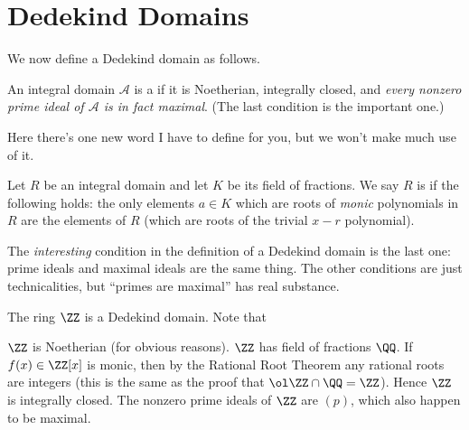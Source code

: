 \section{Dedekind Domains}
We now define a Dedekind domain as follows.
\begin{definition}
	An integral domain $\mathcal A$ is a 
	if it is Noetherian, integrally closed, and 
	\emph{every nonzero prime ideal of $\mathcal A$ is in fact maximal}.
	(The last condition is the important one.)
\end{definition}
Here there's one new word I have to define for you, but we won't make much use of it.
\begin{definition}
	Let $R$ be an integral domain and let $K$ be its field of fractions. 
	We say $R$ is  if the following holds:
	the only elements $a \in K$ which are roots of \emph{monic} polynomials in $R$
	are the elements of $R$ (which are roots of the trivial $x-r$ polynomial).
\end{definition}
The \emph{interesting} condition in the definition
of a Dedekind domain is the last one: prime ideals and maximal ideals
are the same thing.
The other conditions are just technicalities, but ``primes are maximal'' has real substance.
\begin{example}
	The ring $\ZZ$ is a Dedekind domain.
	Note that
	\begin{itemize}
		\ii $\ZZ$ is Noetherian (for obvious reasons).
		\ii $\ZZ$ has field of fractions $\QQ$.
		If $f(x) \in \ZZ[x]$ is monic, then by the Rational Root Theorem
		any rational roots are integers (this is the same as the proof that $\ol\ZZ \cap \QQ = \ZZ$).
		Hence $\ZZ$ is integrally closed.
		\ii The nonzero prime ideals of $\ZZ$ are $(p)$, which also happen to be maximal.
	\end{itemize}
\end{example}


